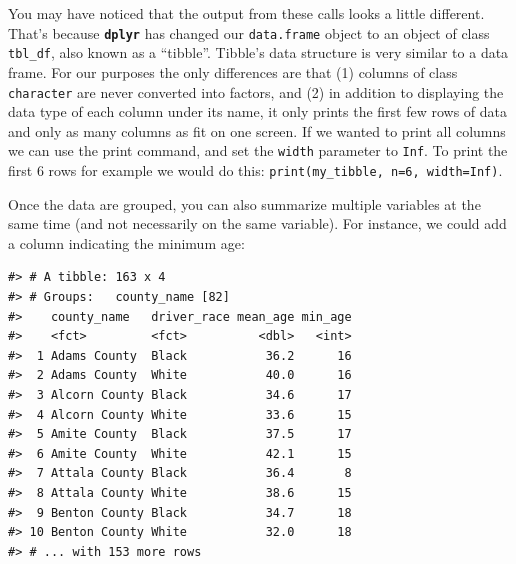 \documentclass[]{book}
\newenvironment{Shaded}{\begin{snugshade}}{\end{snugshade}}
\newcommand{\DataTypeTok}[1]{\textcolor[rgb]{0.13,0.29,0.53}{#1}}
\newcommand{\KeywordTok}[1]{\textcolor[rgb]{0.13,0.29,0.53}{\textbf{#1}}}
\newcommand{\NormalTok}[1]{#1}
\newcommand{\OperatorTok}[1]{\textcolor[rgb]{0.81,0.36,0.00}{\textbf{#1}}}
\newcommand{\OtherTok}[1]{\textcolor[rgb]{0.56,0.35,0.01}{#1}}
\newcommand{\StringTok}[1]{\textcolor[rgb]{0.31,0.60,0.02}{#1}}
\begin{document}
You may have noticed that the output from these calls looks a little different. That's because \textbf{\texttt{dplyr}} has changed our \texttt{data.frame} object
to an object of class \texttt{tbl\_df}, also known as a ``tibble''. Tibble's data
structure is very similar to a data frame. For our purposes the only differences
are that (1) columns of class \texttt{character} are never converted into
factors, and (2) in addition to displaying the data type of each column under its name, it only prints the first few rows of data and only as many columns as fit on one screen. If we wanted to print all columns we can use the print command, and set the \texttt{width} parameter to \texttt{Inf}. To print the first 6 rows for example we would do this: \texttt{print(my\_tibble,\ n=6,\ width=Inf)}.

Once the data are grouped, you can also summarize multiple variables at the same
time (and not necessarily on the same variable). For instance, we could add a
column indicating the minimum age:

\begin{Shaded}
\end{Shaded}

\begin{verbatim}
#> # A tibble: 163 x 4
#> # Groups:   county_name [82]
#>    county_name   driver_race mean_age min_age
#>    <fct>         <fct>          <dbl>   <int>
#>  1 Adams County  Black           36.2      16
#>  2 Adams County  White           40.0      16
#>  3 Alcorn County Black           34.6      17
#>  4 Alcorn County White           33.6      15
#>  5 Amite County  Black           37.5      17
#>  6 Amite County  White           42.1      15
#>  7 Attala County Black           36.4       8
#>  8 Attala County White           38.6      15
#>  9 Benton County Black           34.7      18
#> 10 Benton County White           32.0      18
#> # ... with 153 more rows
\end{verbatim}
\end{document}

